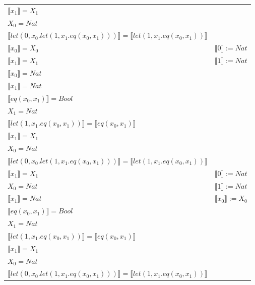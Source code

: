 \begin{exercise}
\begin{description}
\begin{center}
\begin{longtable}{ | l | l | }
                        $ \llbracket x_1 \rrbracket = X_1$  & \\
                        $X_0 = Nat$ & \\
                        $ \llbracket let(0,x_0.let(1,x_1.eq(x_0,x_1))) \rrbracket =  \llbracket let(1,x_1.eq(x_0,x_1)) \rrbracket$ & \\
                      \hline
                        $ \llbracket x_0 \rrbracket = X_0$ &  $ \llbracket 0 \rrbracket := Nat$  \\
                        $ \llbracket x_1 \rrbracket = X_1$  &  $ \llbracket 1 \rrbracket := Nat$ \\
                        $ \llbracket x_0 \rrbracket = Nat$  & \\
		   $ \llbracket x_1 \rrbracket = Nat$  & \\
                        $ \llbracket eq(x_0,x_1) \rrbracket = Bool$  & \\
                        $X_1 = Nat$ & \\
                        $ \llbracket let(1,x_1.eq(x_0,x_1)) \rrbracket =  \llbracket eq(x_0,x_1) \rrbracket$  & \\
                        $ \llbracket x_1 \rrbracket = X_1$  & \\
                        $X_0 = Nat$ & \\
                        $ \llbracket let(0,x_0.let(1,x_1.eq(x_0,x_1))) \rrbracket =  \llbracket let(1,x_1.eq(x_0,x_1)) \rrbracket$ & \\
                      \hline
                        $ \llbracket x_1 \rrbracket = X_1$  &   $ \llbracket 0 \rrbracket := Nat$\\  
                        $X_0 = Nat$  &  $ \llbracket 1 \rrbracket := Nat$ \\
                       $ \llbracket x_1 \rrbracket = Nat$  & $ \llbracket x_0 \rrbracket := X_0$ \\
		  $ \llbracket eq(x_0,x_1) \rrbracket = Bool$  &  \\
                        $X_1 = Nat$ & \\
                        $ \llbracket let(1,x_1.eq(x_0,x_1)) \rrbracket =  \llbracket eq(x_0,x_1) \rrbracket$  & \\
                        $ \llbracket x_1 \rrbracket = X_1$  & \\
                        $X_0 = Nat$ & \\
                        $ \llbracket let(0,x_0.let(1,x_1.eq(x_0,x_1))) \rrbracket =  \llbracket let(1,x_1.eq(x_0,x_1)) \rrbracket$ & \\

\end{longtable}
\end{center}
\end{description}
\end{exercise}
